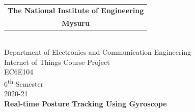 \documentclass[a4paper,12pt]{report}
\begin{document}
\begin{titlepage}
    \begin{center}
        \noindent
        \hfill
        \begin{tabular}{@{}c@{}}
            \textbf{\Large The National Institute of Engineering} \\
            \textbf{\Large{Mysuru}}
        \end{tabular}
        \hfill
         \\
        \vspace{5cm}
        {\huge Department of Electronics and Communication Engineering} \\
        \vspace{2cm}
        \large{Internet of Things Course Project} \\
        \large{EC6E104} \\
        \large{6\textsuperscript{th} Semester} \\
        \large{2020-21} \\
        \vspace{1cm}
        \textbf{\huge Real-time Posture Tracking Using Gyroscope} \\

\end{center}
\end{titlepage}
\end{document}
